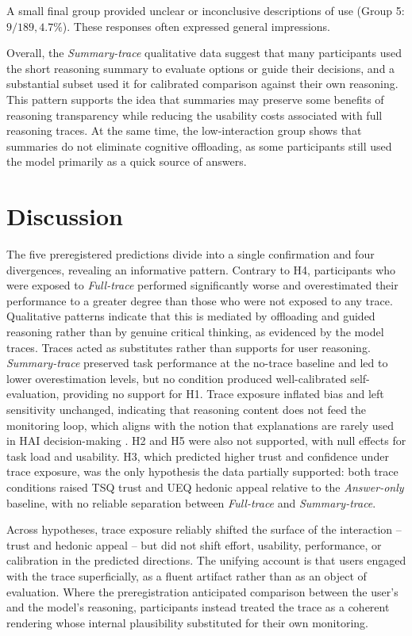 \documentclass[manuscript, anonymous=false,authorversion,review=false]{acmart}
\begin{document}
A small final group provided unclear or inconclusive descriptions of use (Group 5: $9/189, 4.7\%$). These responses often expressed general impressions.  

Overall, the \textit{Summary-trace} qualitative data suggest that many participants used the short reasoning summary to evaluate options or guide their decisions, and a substantial subset used it for calibrated comparison against their own reasoning. This pattern supports the idea that summaries may preserve some benefits of reasoning transparency while reducing the usability costs associated with full reasoning traces. At the same time, the low-interaction group shows that summaries do not eliminate cognitive offloading, as some participants still used the model primarily as a quick source of answers. 

\section{Discussion}



The five preregistered predictions divide into a single confirmation and four divergences, revealing an informative pattern. Contrary to H4, participants who were exposed to \textit{Full-trace} performed significantly worse and overestimated their performance to a greater degree than those who were not exposed to any trace. Qualitative patterns indicate that this is mediated by offloading and guided reasoning rather than by genuine critical thinking, as evidenced by the model traces. Traces acted as substitutes rather than supports for user reasoning. \textit{Summary-trace} preserved task performance at the no-trace baseline and led to lower overestimation levels, but no condition produced well-calibrated self-evaluation, providing no support for H1. Trace exposure inflated bias and left sensitivity unchanged, indicating that reasoning content does not feed the monitoring loop, which aligns with the notion that explanations are rarely used in HAI decision-making \cite{wang2021explanations}. H2 and H5 were also not supported, with null effects for task load and usability. H3, which predicted higher trust and confidence under trace exposure, was the only hypothesis the data partially supported: both trace conditions raised TSQ trust and UEQ hedonic appeal relative to the \textit{Answer-only} baseline, with no reliable separation between \textit{Full-trace} and \textit{Summary-trace}. 


Across hypotheses, trace exposure reliably shifted the surface of the interaction -- trust and hedonic appeal -- but did not shift effort, usability, performance, or calibration in the predicted directions. The unifying account is that users engaged with the trace superficially, as a fluent artifact rather than as an object of evaluation. Where the preregistration anticipated comparison between the user's and the model's reasoning, participants instead treated the trace as a coherent rendering whose internal plausibility substituted for their own monitoring.
\end{document}

